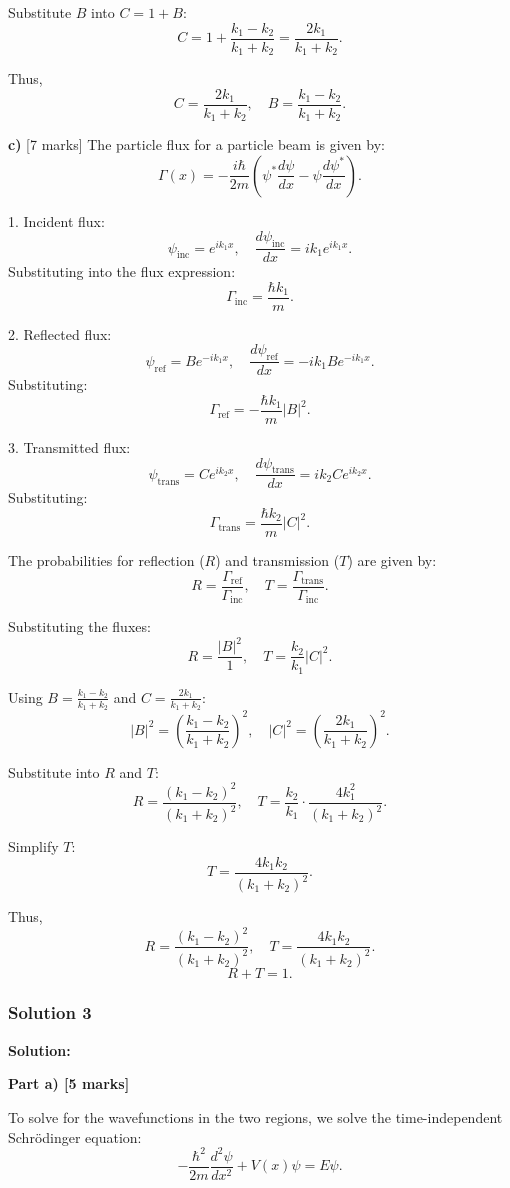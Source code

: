 \documentclass{article}
\begin{document}
Substitute $B$ into $C = 1 + B$:  
\[
C = 1 + \frac{k_1 - k_2}{k_1 + k_2} = \frac{2k_1}{k_1 + k_2}.
\]  

Thus,  
\[
C = \frac{2k_1}{k_1 + k_2}, \quad B = \frac{k_1 - k_2}{k_1 + k_2}.
\]  

\textbf{c)} [7 marks]  
The particle flux for a particle beam is given by:  
\[
\Gamma(x) = -\frac{i\hbar}{2m} \left( \psi^* \frac{d\psi}{dx} - \psi \frac{d\psi^*}{dx} \right).
\]  

1. Incident flux:  
\[
\psi_\text{inc} = e^{ik_1x}, \quad \frac{d\psi_\text{inc}}{dx} = ik_1 e^{ik_1x}.
\]  
Substituting into the flux expression:  
\[
\Gamma_\text{inc} = \frac{\hbar k_1}{m}.
\]  

2. Reflected flux:  
\[
\psi_\text{ref} = Be^{-ik_1x}, \quad \frac{d\psi_\text{ref}}{dx} = -ik_1 B e^{-ik_1x}.
\]  
Substituting:  
\[
\Gamma_\text{ref} = -\frac{\hbar k_1}{m} |B|^2.
\]  

3. Transmitted flux:  
\[
\psi_\text{trans} = Ce^{ik_2x}, \quad \frac{d\psi_\text{trans}}{dx} = ik_2 C e^{ik_2x}.
\]  
Substituting:  
\[
\Gamma_\text{trans} = \frac{\hbar k_2}{m} |C|^2.
\]  

The probabilities for reflection ($R$) and transmission ($T$) are given by:  
\[
R = \frac{\Gamma_\text{ref}}{\Gamma_\text{inc}}, \quad T = \frac{\Gamma_\text{trans}}{\Gamma_\text{inc}}.
\]  

Substituting the fluxes:  
\[
R = \frac{|B|^2}{1}, \quad T = \frac{k_2}{k_1} |C|^2.
\]  

Using $B = \frac{k_1 - k_2}{k_1 + k_2}$ and $C = \frac{2k_1}{k_1 + k_2}$:  
\[
|B|^2 = \left(\frac{k_1 - k_2}{k_1 + k_2}\right)^2, \quad |C|^2 = \left(\frac{2k_1}{k_1 + k_2}\right)^2.
\]  

Substitute into $R$ and $T$:  
\[
R = \frac{(k_1 - k_2)^2}{(k_1 + k_2)^2}, \quad T = \frac{k_2}{k_1} \cdot \frac{4k_1^2}{(k_1 + k_2)^2}.
\]  

Simplify $T$:  
\[
T = \frac{4k_1k_2}{(k_1 + k_2)^2}.
\]  

Thus,  
\[
R = \frac{(k_1 - k_2)^2}{(k_1 + k_2)^2}, \quad T = \frac{4k_1k_2}{(k_1 + k_2)^2}.
\]  
\[
\boxed{R + T = 1}.
\]  

\subsubsection{Solution 3}
\textbf{Solution:}

\textbf{Part a) [5 marks]} 

To solve for the wavefunctions in the two regions, we solve the time-independent Schrödinger equation:
\[
-\frac{\hbar^2}{2m} \frac{d^2 \psi}{dx^2} + V(x)\psi = E\psi.
\]
\end{document}
